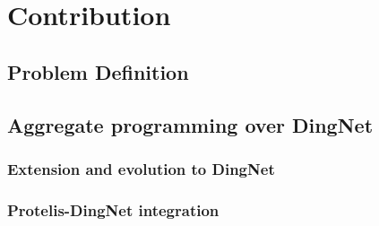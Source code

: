 \chapter{Contribution}
\label{chap:contribution}

\section{Problem Definition}




\section{Aggregate programming over DingNet}
\subsection{Extension and evolution to DingNet}



\subsection{Protelis-DingNet integration}


